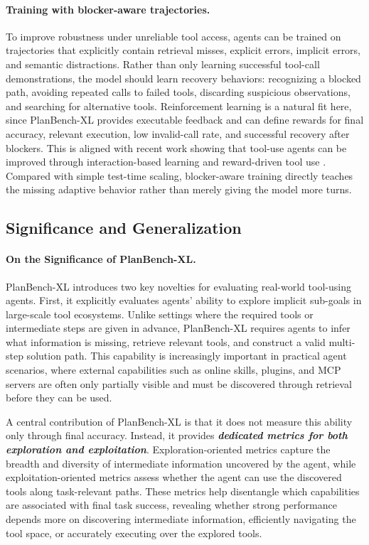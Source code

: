 \documentclass{llmxive}
\providecommand{\bench}[1]{PlanBench-XL}
\begin{document}
\paragraph{Training with blocker-aware trajectories.}
To improve robustness under unreliable tool access, agents can be trained on trajectories that explicitly contain retrieval misses, explicit errors, implicit errors, and semantic distractions. Rather than only learning successful tool-call demonstrations, the model should learn recovery behaviors: recognizing a blocked path, avoiding repeated calls to failed tools, discarding suspicious observations, and searching for alternative tools. Reinforcement learning is a natural fit here, since \bench{} provides executable feedback and can define rewards for final accuracy, relevant execution, low invalid-call rate, and successful recovery after blockers. This is aligned with recent work showing that tool-use agents can be improved through interaction-based learning and reward-driven tool use \citep{schick2023toolformer,ToolRL}. Compared with simple test-time scaling, blocker-aware training directly teaches the missing adaptive behavior rather than merely giving the model more turns.


\subsection{Significance and Generalization}
\label{app:significance-generalization}

\paragraph{On the Significance of \bench{}.}

\bench{} introduces two key novelties for evaluating real-world tool-using agents. First, it explicitly evaluates agents' ability to explore implicit sub-goals in large-scale tool ecosystems. Unlike settings where the required tools or intermediate steps are given in advance, \bench{} requires agents to infer what information is missing, retrieve relevant tools, and construct a valid multi-step solution path. This capability is increasingly important in practical agent scenarios, where external capabilities such as online skills, plugins, and MCP servers are often only partially visible and must be discovered through retrieval before they can be used.

A central contribution of \bench{} is that it does not measure this ability only through final accuracy. 
Instead, it provides \textbf{\textit{dedicated metrics for both exploration and exploitation}}. 
Exploration-oriented metrics capture the breadth and diversity of intermediate information uncovered by the agent, while exploitation-oriented metrics assess whether the agent can use the discovered tools along task-relevant paths.
These metrics help disentangle which capabilities are associated with final task success, revealing whether strong performance depends more on discovering intermediate information, efficiently navigating the tool space, or accurately executing over the explored tools.
\end{document}
